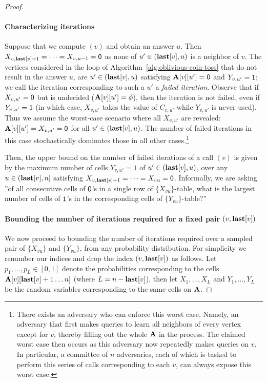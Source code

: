 \begin{proof}
\paragraph*{Characterizing iterations}
Suppose that we compute $(v)$ and obtain an answer $u$. Then $X_{v,\mathbf{last}[v]+1} = \cdots = X_{v, u-1} = \mathsf{0}$ as none of $u' \in (\mathbf{last}[v], u)$ is a neighbor of $v$. The vertices considered in the loop of Algorithm~\ref{alg:oblivious-coin-toss} that do not result in the answer $u$, are $u' \in (\mathbf{last}[v], u)$ satisfying $\mathbf{A}[v][u'] = \mathsf{0}$ and $Y_{v,u'} = \mathsf{1}$; we call the iteration corresponding to such a $u'$ a \emph{failed iteration}. Observe that if $X_{v,u'} = \mathsf{0}$ but is undecided ($\mathbf{A}[v][u'] = \phi$), then the iteration is not failed, even if $Y_{v,u'} = \mathsf{1}$ (in which case, $X_{v,u'}$ takes the value of $C_{v,u'}$ while $Y_{v,u'}$ is never used). Thus we assume the worst-case scenario where all $X_{v,u'}$ are revealed: $\mathbf{A}[v][u']=X_{v,u'}=\mathsf{0}$ for all $u'\in(\mathbf{last}[v], u)$. The number of failed iterations in this case stochastically dominates those in all other cases.\footnote{There exists an adversary who can enforce this worst case. Namely, an adversary that first makes  queries to learn all neighbors of every vertex except for $v$, thereby filling out the whole $\mathbf{A}$ in the process. The claimed worst case then occurs as this adversary now repeatedly makes  queries on $v$. In particular, a committee of $n$ adversaries, each of which is tasked to perform this series of calls corresponding to each $v$, can always expose this worst case.}

Then, the upper bound on the number of failed iterations of a call $(v)$ is given by the maximum number of cells $Y_{v, u'} = 1$ of $u' \in(\mathbf{last}[v], u)$, over any $u \in(\mathbf{last}[v], n]$ satisfying $X_{v,\mathbf{last}[v]+1} = \cdots = X_{vu} = \mathsf{0}$. Informally, we are asking ''of all consecutive cells of $\mathsf{0}$'s in a single row of $\{X_{vu}\}$-table, what is the largest number of cells of $\mathsf{1}$'s in the corresponding cells of $\{Y_{vu}\}$-table?''

\paragraph*{Bounding the number of iterations required for a fixed pair $(v, \mathbf{last}[v])$}
We now proceed to bounding the number of iterations required over a sampled pair of $\{X_{vu}\}$ and $\{Y_{vu}\}$, from any probability distribution. For simplicity we renumber our indices and drop the index $(v,\mathbf{last}[v])$ as follows. Let $p_1, \ldots, p_L \in [0, 1]$ denote the probabilities corresponding to the cells $\mathbf{A}[v][\mathbf{last}[v]+1 \ldots n]$ (where $L = n-\mathbf{last}[v]$), then let $X_1, \ldots, X_L$ and $Y_1, \ldots, Y_L$ be the random variables corresponding to the same cells on $\mathbf{A}$.


\end{proof}
